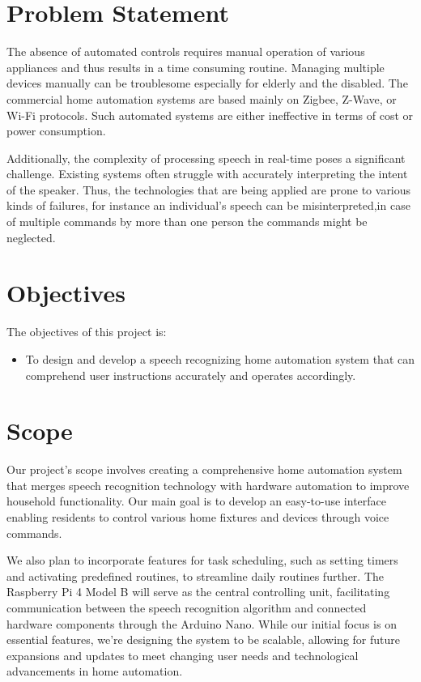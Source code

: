     \section{Problem Statement}
    The absence of automated controls requires manual operation of various appliances and thus results in a time consuming routine. Managing multiple devices  manually  can be troublesome especially for elderly and the disabled. The commercial home automation systems are based mainly on Zigbee, Z-Wave, or Wi-Fi protocols. Such automated systems are either ineffective in terms of cost or power consumption. 

    Additionally, the complexity of processing speech in real-time poses a significant challenge. Existing systems often struggle with accurately interpreting the intent of the speaker. Thus, the technologies that are being applied are prone to various kinds of failures, for instance an individual’s speech can be misinterpreted,in case of multiple commands by more than one person the commands might be neglected. 

    
    \section{Objectives}
    The objectives of this project is:
        \begin{itemize}
        \setlength\itemsep{1.5pt}
        \item To design and develop a speech recognizing home automation system that can comprehend user instructions accurately and operates accordingly.

        \end{itemize}


    \section{Scope}
    Our project's scope involves creating a comprehensive home automation system that merges speech recognition technology with hardware automation to improve household functionality. Our main goal is to develop an easy-to-use interface enabling residents to control various home fixtures and devices through voice commands. 

    We also plan to incorporate features for task scheduling, such as setting timers and activating predefined routines, to streamline daily routines further. The Raspberry Pi 4 Model B will serve as the central controlling unit, facilitating communication between the speech recognition algorithm and connected hardware components through the Arduino Nano. While our initial focus is on essential features, we're designing the system to be scalable, allowing for future expansions and updates to meet changing user needs and technological advancements in home automation.
         
